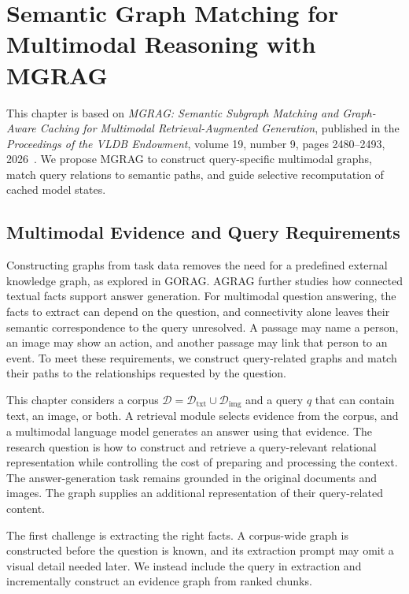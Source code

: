 \chapter{Semantic Graph Matching for Multimodal Reasoning with MGRAG}
\label{ch:mgrag}

This chapter is based on \emph{MGRAG: Semantic Subgraph Matching and Graph-Aware Caching for Multimodal Retrieval-Augmented Generation}, published in the \emph{Proceedings of the VLDB Endowment}, volume 19, number 9, pages 2480--2493, 2026~\cite{mgrag-paper}. We propose MGRAG to construct query-specific multimodal graphs, match query relations to semantic paths, and guide selective recomputation of cached model states.

\section{Multimodal Evidence and Query Requirements}
\label{sec:mgrag:problem}

Constructing graphs from task data removes the need for a predefined external knowledge graph, as explored in GORAG. AGRAG further studies how connected textual facts support answer generation. For multimodal question answering, the facts to extract can depend on the question, and connectivity alone leaves their semantic correspondence to the query unresolved. A passage may name a person, an image may show an action, and another passage may link that person to an event. To meet these requirements, we construct query-related graphs and match their paths to the relationships requested by the question.

This chapter considers a corpus $\mathcal D=\mathcal D_{\mathrm{txt}}\cup\mathcal D_{\mathrm{img}}$ and a query $q$ that can contain text, an image, or both. A retrieval module selects evidence from the corpus, and a multimodal language model generates an answer using that evidence. The research question is how to construct and retrieve a query-relevant relational representation while controlling the cost of preparing and processing the context. The answer-generation task remains grounded in the original documents and images. The graph supplies an additional representation of their query-related content.

The first challenge is extracting the right facts. A corpus-wide graph is constructed before the question is known, and its extraction prompt may omit a visual detail needed later. We instead include the query in extraction and incrementally construct an evidence graph from ranked chunks.

